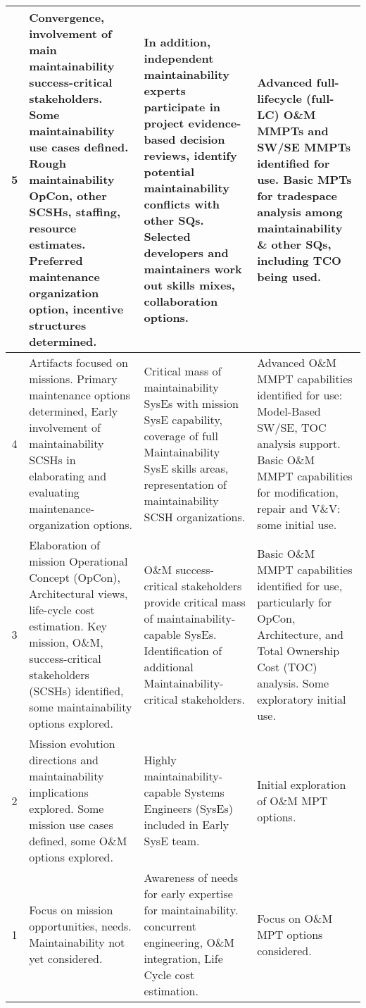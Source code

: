 \begin{table*}[htbp]
{\begin{tabular}{|c|p{18em}|p{18em}|p{16.5em}|}
			\midrule
			5     & Convergence, involvement of main maintainability success-critical stakeholders. Some maintainability use cases defined. Rough maintainability OpCon, other SCSHs, staffing, resource estimates. Preferred maintenance organization option, incentive structures determined. & In addition, independent maintainability experts participate in project evidence-based decision reviews, identify potential maintainability conflicts with other SQs. Selected developers and maintainers work out skills mixes, collaboration options. & Advanced full-lifecycle (full-LC) O\&M MMPTs and SW/SE MMPTs identified for use. Basic MPTs for tradespace analysis among maintainability \& other SQs, including TCO being used. \\
			\midrule
			4     & Artifacts focused on missions. Primary maintenance options determined, Early involvement of maintainability SCSHs in elaborating and evaluating maintenance-organization options. & Critical mass of maintainability SysEs with mission SysE capability, coverage of full Maintainability SysE skills areas, representation of maintainability SCSH organizations. & Advanced O\&M MMPT capabilities identified for use: Model-Based SW/SE, TOC analysis support. Basic O\&M MMPT capabilities for modification, repair and V\&V: some initial use. \\
			\midrule
			3     & Elaboration of mission Operational Concept (OpCon), Architectural views, life-cycle cost estimation. Key mission, O\&M, success-critical stakeholders (SCSHs) identified, some maintainability options explored. & O\&M success-critical stakeholders provide critical mass of maintainability-capable SysEs. Identification of additional Maintainability-critical stakeholders. & Basic O\&M MMPT capabilities identified for use, particularly for OpCon, Architecture, and Total Ownership Cost (TOC) analysis. Some exploratory initial use. \\
			\midrule
			2     & Mission evolution directions and maintainability implications explored. Some mission use cases defined, some O\&M options explored. & Highly maintainability-capable Systems Engineers (SysEs) included in Early SysE team. & Initial exploration of O\&M MPT options. \\
			\midrule
			1     & Focus on mission opportunities, needs. Maintainability not yet considered. & Awareness of needs for early expertise for maintainability. concurrent engineering, O\&M integration, Life Cycle cost estimation. & Focus on O\&M MPT options considered. \\
			\bottomrule
		\end{tabular}%
	}
	\label{tab:smrf}%
\end{table*}%

